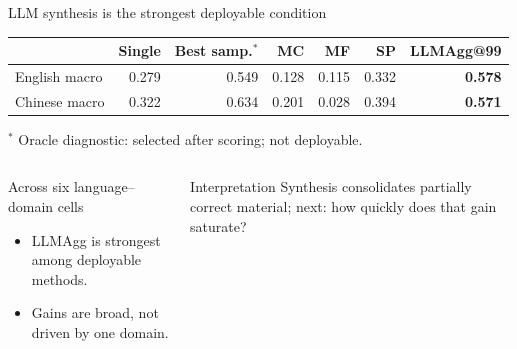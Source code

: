 \documentclass[aspectratio=169,10pt]{beamer}
\newcommand{\pos}[1]{\textcolor{positive}{#1}}
\newcommand{\muted}[1]{\textcolor{neutral}{#1}}
\newcommand{\LLMAgg}{\textsf{LLMAgg}}
\begin{document}
\begin{frame}{LLM synthesis is the strongest deployable condition}
  \begin{center}
  \vspace{4pt}
  \color{ink}
  \begin{tabular}{@{}lrrrrrr@{}}
    \toprule
    & \textbf{Single} & \textcolor{neutral}{\textbf{Best samp.$^{\ast}$}} & \textbf{MC} & \textbf{MF} & \textbf{SP} & \textbf{\LLMAgg{}@99}\\
    \midrule
    English macro & 0.279 & \muted{0.549} & 0.128 & 0.115 & 0.332 & \textbf{\pos{0.578}}\\
    Chinese macro & 0.322 & \muted{0.634} & 0.201 & 0.028 & 0.394 & \textbf{\pos{0.571}}\\
    \bottomrule
  \end{tabular}
  \end{center}
  \vspace{-2pt}
  {\footnotesize \textcolor{neutral}{$^{\ast}$} Oracle diagnostic: selected after scoring; not deployable.}
  \vspace{8pt}
  \begin{columns}[T,onlytextwidth]
      \begin{block}{Across six language--domain cells}
        \begin{itemize}
          \item \LLMAgg{} is strongest among deployable methods.
          \item Gains are broad, not driven by one domain.
        \end{itemize}
      \end{block}
      \begin{alertblock}{Interpretation}
        \small Synthesis consolidates partially correct material; next: how quickly does that gain saturate?
      \end{alertblock}
  \end{columns}
\end{frame}
\end{document}

